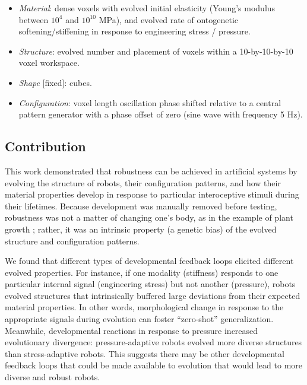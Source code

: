 \begin{itemize}
    \item \textit{Material}: dense voxels with evolved initial elasticity (Young's modulus between $10^4$ and $10^{10}$ MPa), and evolved rate of ontogenetic softening/stiffening in response to engineering stress / pressure.
    \item \textit{Structure}: evolved number and placement of voxels within a 10-by-10-by-10 voxel workspace.
    \item \textit{Shape} [fixed]: cubes.
    \item \textit{Configuration}: voxel length oscillation phase shifted relative to a central pattern generator with a phase offset of zero (sine wave with frequency 5 Hz).
\end{itemize}



\subsection{Contribution}


This work demonstrated that robustness can be achieved in artificial systems by evolving the structure of robots, their configuration patterns, and how
their material properties develop in response to particular interoceptive stimuli during their lifetimes.
Because development was manually removed before testing, robustness was not a matter of changing one's body, as in the example of plant growth \citep{sultan2000phenotypic}; 
rather, it was an intrinsic property (a genetic bias) of the evolved structure and configuration patterns.

We found that different types of developmental feedback loops elicited different evolved properties.
For instance, if one modality (stiffness) responds to one particular internal signal (engineering stress) but not another (pressure), robots evolved structures that intrinsically buffered large deviations from their expected material properties.
In other words, morphological change in response to the appropriate signals during evolution can foster ``zero-shot'' generalization.
Meanwhile, developmental reactions in response to pressure increased evolutionary divergence: 
pressure-adaptive robots evolved more diverse 
structures than stress-adaptive robots.
This suggests
there may be other developmental feedback loops that could be made available to evolution
that would lead to more diverse and robust robots.

